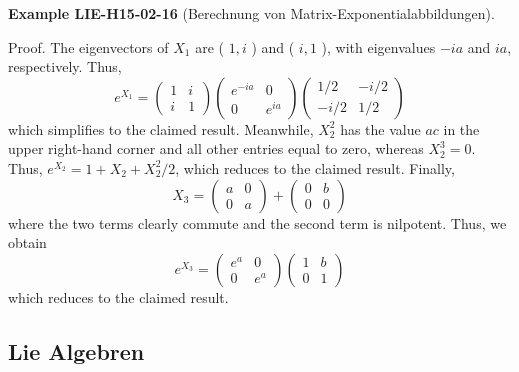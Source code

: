 \documentclass[10pt, letterpaper]{article}
\newcommand{\CustomHeading}[3]{%
  \par\medskip\noindent%
  \textbf{#1 #2} \textnormal{(#3)}.\enskip%
}
\newenvironment{EXA}[2]{\CustomHeading{Example}{#1}{#2}}{}
\begin{document}
\begin{EXA}{LIE-H15-02-16}{Berechnung von Matrix-Exponentialabbildungen}
Proof. The eigenvectors of $X_{1}$ are ( $1, i$ ) and ( $i, 1$ ), with eigenvalues $-i a$ and $i a$, respectively. Thus,
$$
e^{X_{1}}=\left(\begin{array}{cc}
1 & i \\
i & 1
\end{array}\right)\left(\begin{array}{cc}
e^{-i a} & 0 \\
0 & e^{i a}
\end{array}\right)\left(\begin{array}{rr}
1 / 2 & -i / 2 \\
-i / 2 & 1 / 2
\end{array}\right)
$$
which simplifies to the claimed result. Meanwhile, $X_{2}^{2}$ has the value $a c$ in the upper right-hand corner and all other entries equal to zero, whereas $X_{2}^{3}=0$. Thus, $e^{X_{2}}= 1+X_{2}+X_{2}^{2} / 2$, which reduces to the claimed result. Finally,
$$
X_{3}=\left(\begin{array}{cc}
a & 0 \\
0 & a
\end{array}\right)+\left(\begin{array}{ll}
0 & b \\
0 & 0
\end{array}\right)
$$
where the two terms clearly commute and the second term is nilpotent. Thus, we obtain
$$
e^{X_{3}}=\left(\begin{array}{cc}
e^{a} & 0 \\
0 & e^{a}
\end{array}\right)\left(\begin{array}{ll}
1 & b \\
0 & 1
\end{array}\right)
$$
which reduces to the claimed result.
\end{EXA}

\subsection{Lie Algebren}
\end{document}

